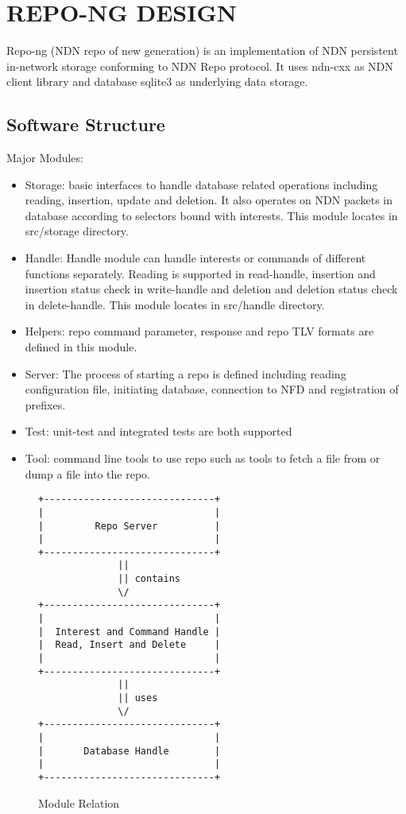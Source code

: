 \documentclass{acm_proc_article-sp}
\begin{document}
\section{REPO-NG DESIGN}
Repo-ng (NDN repo of new generation) is an implementation of NDN persistent in-network storage conforming to NDN Repo protocol. It uses ndn-cxx as NDN client library and database sqlite3 as underlying data storage.

\subsection{Software Structure}
Major Modules:
\begin{itemize}
\item Storage: basic interfaces to handle database related operations including reading, insertion, update and deletion. It also operates on NDN packets in database according to selectors bound with interests. This module locates in src/storage directory.
\item Handle: Handle module can handle interests or commands of different functions separately. Reading is supported in read-handle, insertion and insertion status check in write-handle and deletion and deletion status check in delete-handle. This module locates in src/handle directory.
\item Helpers: repo command parameter, response and repo TLV formats are defined in this module.
\item Server: The process of starting a repo is defined  including reading configuration file, initiating database, connection to NFD and registration of prefixes.
\item Test: unit-test and integrated tests are both supported
\item Tool: command line tools to use repo such as tools to fetch a file from or dump a file into the repo.
\end{itemize}

\begin{figure*}
\centering
\begin{BVerbatim}
+------------------------------+
|                              |
|         Repo Server          |
|                              |
+------------------------------+
              ||
              || contains
              \/
+------------------------------+
|                              |
|  Interest and Command Handle |
|  Read, Insert and Delete     |
|                              |
+------------------------------+
              ||
              || uses
              \/
+------------------------------+
|                              |
|       Database Handle        |
|                              |
+------------------------------+

\end{BVerbatim}
\caption{Module Relation}
\end{figure*}
\end{document}
